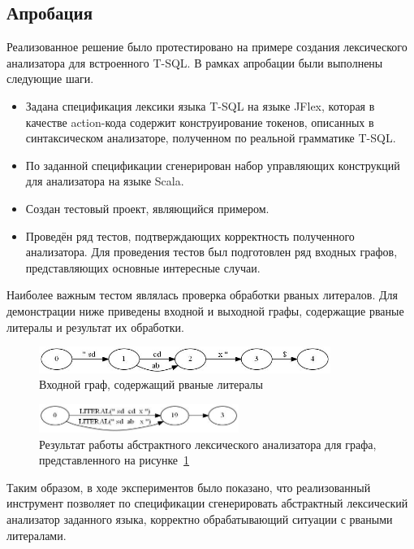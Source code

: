 \subsection{Апробация}
Реализованное решение было протестировано на примере создания лексического 
анализатора для встроенного T-SQL. В рамках апробации были выполнены следующие 
шаги. 
\begin{itemize}
    \item Задана спецификация лексики языка T-SQL на языке JFlex, которая в 
    качестве action-кода содержит конструирование токенов, описанных в 
    синтаксическом анализаторе, полученном по реальной грамматике T-SQL.
    \item По заданной спецификации сгенерирован набор управляющих конструкций 
    для анализатора на языке Scala.
    \item Создан тестовый проект, являющийся примером.
    \item Проведён ряд тестов, подтверждающих корректность полученного 
    анализатора. Для проведения тестов был подготовлен ряд входных графов, 
    представляющих основные интересные случаи.
\end{itemize}

Наиболее важным тестом являлась проверка обработки рваных литералов. Для 
демонстрации ниже приведены входной и выходной графы, содержащие рваные 
литералы и результат их обработки.
\begin{figure}[h]
 \label{Literals}
 \centering
 \includegraphics[width=9.5cm]{Verbitskaya/Literals_1.jpg}
 \caption{Входной граф, содержащий рваные литералы}
 \label{Literals}
\end{figure}

\begin{figure}[h]
 \label{LiteralsLex}
 \centering
 \includegraphics[width=6.5cm]{Verbitskaya/Literals_1_lex.jpg}
 \caption{Результат работы абстрактного лексического анализатора для графа, 
    представленного на рисунке~\ref{Literals}}
 \label{LiteralsLex}
\end{figure}

Таким образом, в ходе экспериментов было показано, что реализованный инструмент 
позволяет по спецификации сгенерировать абстрактный лексический анализатор 
заданного языка, корректно обрабатывающий ситуации с рваными литералами.


